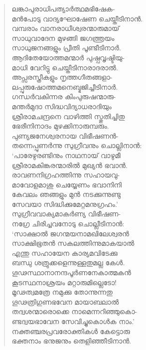 \begin{verse}
ലങ്കാപുരാധിപത്യാര്‍ത്ഥമഭിഷേക-\\
മന്‍പോടു വാദ്യഘോഷേണ ചെയ്തീടിനാന്‍.\\
വമ്പരാം വാനരാധീശ്വരന്മാരുമായ്\\
സാധുവാദേന മുഴങ്ങി ജഗത്ത്രയം\\
സാധുജനങ്ങളും പ്രീതി പൂണ്ടീടിനാര്‍.\\
ആദിതേയോത്തമന്മാര്‍ പുഷ്പവൃഷ്ടിയു-\\
മാധി വേറിട്ടു ചെയ്തീടിനാരാദരാല്‍.\\
അപ്സരസ്ത്രീകളും നൃത്തഗീതങ്ങളാ-\\
ലപ്പുരുഷോത്തമനെബ്ഭജിച്ചീടിനാര്‍.\\
ഗന്ധര്‍വകിന്നര കിംപുരുഷന്മാരു-\\
മന്തര്‍മുദാ സിദ്ധവിദ്യാധരാദിയും\\
ശ്രീരാമചന്ദ്രനെ വാഴിത്തി സ്തുതിച്ചിതു\\
ഭേരീനിനാദം മുഴക്കിനാരുമ്പരും.\\
പുണ്യജനേശ്വരനായ വിഭീഷണന്‍-\\
തന്നെപ്പുണര്‍ന്നു സുഗ്രീവനും ചൊല്ലിനാന്‍:\\
‘പാരേഴുരണ്ടിനും നാഥനായ് വാഴുമീ\\
ശ്രീരാമകിങ്കരന്മാരില്‍ മുഖ്യന്‍ ഭവാന്‍.\\
രാവണനിഗ്രഹത്തിന്നു സഹായവു-\\
മാവോളമാശു ചെയ്യേണം ഭവാനിനി\\
കേവലം ഞങ്ങളും മുന്‍ നടക്കുന്നുണ്ടു\\
സേവയാ സിദ്ധിക്കുമേറ്റമനുഗ്രഹം.’\\
സുഗ്രീവവാക്യമാകര്‍ണ്യ വിഭീഷണ-\\
നഗ്രേ ചിരിച്ചവനോടു ചൊല്ലീടിനാന്‍:\\
‘സാക്ഷാല്‍ ജഗന്മയനാമഖിലേശ്വരന്‍\\
സാക്ഷിഭൂതന്‍ സകലത്തിന്നുമാകയാല്‍\\
എന്തു സഹായേന കാര്യമവിടേക്കു\\
ബന്ധു ശത്രുക്കളെന്നുള്ളതുമല്ല കേള്‍.\\
ഗൂഢസ്ഥാനാനന്ദപൂര്‍ണനേകാത്മകന്‍\\
കൂടസ്ഥനാശ്രയം മറ്റാരുമില്ലെടോ!\\
മൂഢത്വമത്രേ നമുക്കു തോന്നുന്നതു\\
ഗൂഢത്രിഗുണഭവേന മായാബലാല്‍\\
തദ്വശന്മാരൊക്കെ നാമെന്നറിഞ്ഞുകൊ-\\
ണ്ടദ്വയഭാവേന സേവിച്ചുകൊള്‍ക നാം.’\\
നക്തഞ്ചരപ്രവരോക്തികള്‍ കേട്ടൊരു\\
ഭക്തനാം ഭനുജനും തെളിഞ്ഞീടിനാന്‍.
\end{verse}

